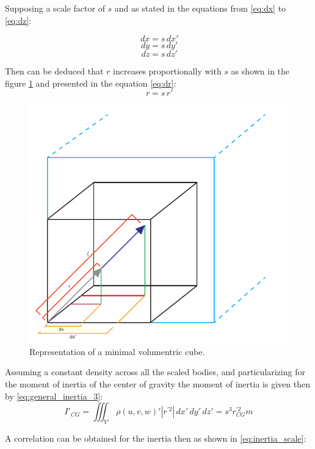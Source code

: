 Supposing a scale factor of $s$ and as stated in the equations from \ref{eq:dx} to \ref{eq:dz}:

\begin{multicols}{3}
  \begin{equation}
  \label{eq:dx}
    \,dx=s \,dx'
  \end{equation}\break
  \begin{equation}
  \label{eq:dy}
    \,dy=s \,dy'
  \end{equation}\break
  \begin{equation}
  \label{eq:dz}
    \,dz=s \,dz'
  \end{equation}\break
\end{multicols}

Then can be deduced that $r$ increases proportionally with $s$ as shown in the figure \ref{fig:dimensional_analysis} and presented in the equation \ref{eq:dr}:
\begin{equation}
  \label{eq:dr}
  \,r=s \,r'
\end{equation}

\begin{figure}[ht!]
  \centering
  \includegraphics[width=0.5\linewidth]{figures/dimensional_analysis.pdf}
  \caption{Representation of a minimal volumentric cube.}
  \label{fig:dimensional_analysis}
\end{figure}

Assuming a constant density across all the scaled bodies, and particularizing for the moment of inertia of the center of gravity the moment of inertia is given then by \ref{eq:general_inertia_3}:
\begin{equation}
  \label{eq:general_inertia_3}
  I'_{CG} = \iiint_{V'} \rho(u,v,w)' |r^{'2}| \,dx'\,dy'\,dz' = s^{3} r_{CG}^{'2} m
\end{equation}

A correlation can be obtained for the inertia then as shown in \ref{eq:inertia_scale}:

